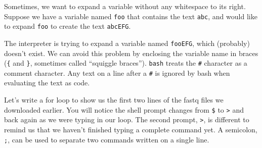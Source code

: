 \documentclass[
  letterpaper,
  DIV=11,
  numbers=noendperiod]{scrreprt}
\newenvironment{Shaded}{\begin{snugshade}}{\end{snugshade}}
\newcommand{\CommentTok}[1]{\textcolor[rgb]{0.37,0.37,0.37}{#1}}
\newcommand{\ExtensionTok}[1]{\textcolor[rgb]{0.00,0.23,0.31}{#1}}
\newcommand{\NormalTok}[1]{\textcolor[rgb]{0.00,0.23,0.31}{#1}}
\newcommand{\VariableTok}[1]{\textcolor[rgb]{0.07,0.07,0.07}{#1}}
\begin{document}
Sometimes, we want to expand a variable without any whitespace to its
right. Suppose we have a variable named \texttt{foo} that contains the
text \texttt{abc}, and would like to expand \texttt{foo} to create the
text \texttt{abcEFG}.

\begin{Shaded}
\end{Shaded}

The interpreter is trying to expand a variable named \texttt{fooEFG},
which (probably) doesn't exist. We can avoid this problem by enclosing
the variable name in braces (\texttt{\{} and \texttt{\}}, sometimes
called ``squiggle braces''). \texttt{bash} treats the \texttt{\#}
character as a comment character. Any text on a line after a \texttt{\#}
is ignored by bash when evaluating the text as code.

\begin{Shaded}
\end{Shaded}

Let's write a for loop to show us the first two lines of the fastq files
we downloaded earlier. You will notice the shell prompt changes from
\texttt{\$} to \texttt{\textgreater{}} and back again as we were typing
in our loop. The second prompt, \texttt{\textgreater{}}, is different to
remind us that we haven't finished typing a complete command yet. A
semicolon, \texttt{;}, can be used to separate two commands written on a
single line.

\begin{Shaded}
\end{Shaded}
\end{document}

